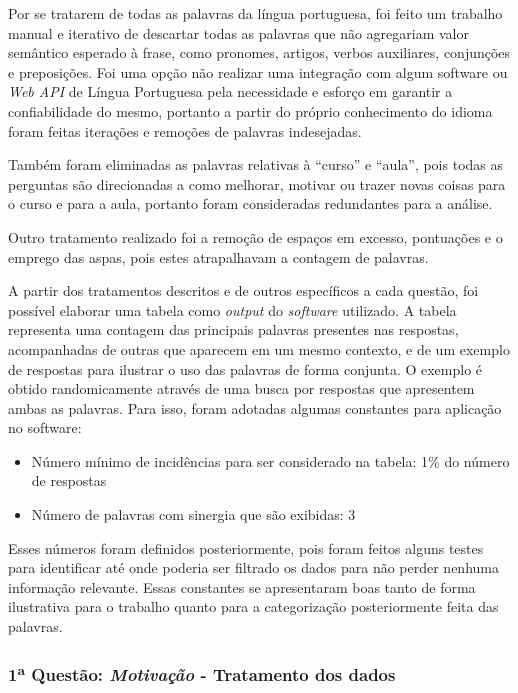 Por se tratarem de todas as palavras da língua portuguesa, foi feito um trabalho manual e iterativo de descartar todas as palavras que não agregariam valor semântico esperado à frase, como pronomes, artigos, verbos auxiliares, conjunções e preposições. Foi uma opção não realizar uma integração com algum software ou \textit{Web API} de Língua Portuguesa pela necessidade e esforço em garantir a confiabilidade do mesmo, portanto a partir do próprio conhecimento do idioma foram feitas iterações e remoções de palavras indesejadas.

Também foram eliminadas as palavras relativas à \enquote{curso} e \enquote{aula}, pois todas as perguntas são direcionadas a como melhorar, motivar ou trazer novas coisas para o curso e para a aula, portanto foram consideradas redundantes para a análise.

Outro tratamento realizado foi a remoção de espaços em excesso, pontuações e o emprego das aspas, pois estes atrapalhavam a contagem de palavras.

A partir dos tratamentos descritos e de outros específicos a cada questão, foi possível elaborar uma tabela como \textit{output} do \textit{software} utilizado. A tabela representa uma contagem das principais palavras presentes nas respostas, acompanhadas de outras que aparecem em um mesmo contexto, e de um exemplo de respostas para ilustrar o uso das palavras de forma conjunta. O exemplo é obtido randomicamente através de uma busca por respostas que apresentem ambas as palavras. Para isso, foram adotadas algumas constantes para aplicação no software:

\begin{itemize}
\item Número mínimo de incidências para ser considerado na tabela: 1\% do número de respostas
\item Número de palavras com sinergia que são exibidas: 3
\end{itemize}

Esses números foram definidos posteriormente, pois foram feitos alguns testes para identificar até onde poderia ser filtrado os dados para não perder nenhuma informação relevante. Essas constantes se apresentaram boas tanto de forma ilustrativa para o trabalho quanto para a categorização posteriormente feita das palavras.

\subsubsection*{1\textsuperscript{a} Questão: \textit{Motivação} - Tratamento dos dados }

